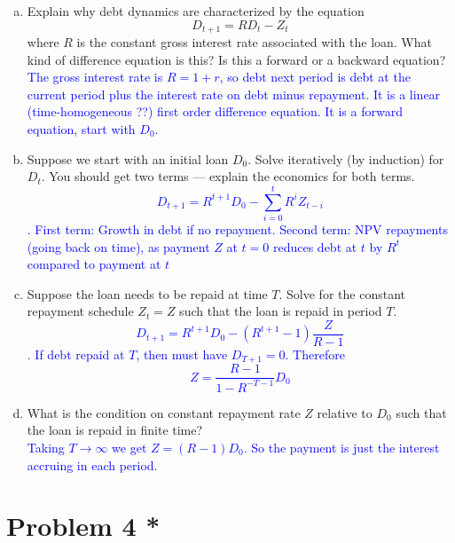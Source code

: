\documentclass[11pt]{extarticle}
\theoremstyle{plain}
\theoremstyle{definition}
\begin{document}
\begin{enumerate}[(a)]
\item Explain why debt dynamics are characterized by the equation
\begin{equation*}
	D_{t+1} = RD_t - Z_t
\end{equation*}
where $R$ is the constant gross interest rate associated with the loan. What kind of difference equation is this? Is this a forward or a backward equation? \\
\textcolor{blue}{The gross interest rate is $R=1+r$, so debt next period is debt at the current period plus the interest rate on debt minus repayment. It is a linear (time-homogeneous ??) first order difference equation. It is a forward equation, start with $D_0$.}

\item Suppose we start with an initial loan $D_0$. Solve iteratively (by induction) for $D_t$. You should get two terms --- explain the economics for both terms.\\
\textcolor{blue}{$$D_{t+1}=R^{t+1} D_0-\sum_{i=0}^t R^i Z_{t-i}$$. First term: Growth in debt if no repayment. Second term: NPV repayments (going back on time), as payment $Z$ at $t=0$ reduces debt at $t$ by $R^t$ compared to payment at $t$ }

\item Suppose the loan needs to be repaid at time $T$. Solve for the constant repayment schedule $Z_t = Z$ such that the loan is repaid in period $T$.\\
\textcolor{blue}{$$D_{t+1}=R^{t+1} D_0-\left(R^{t+1}-1\right) \frac{Z}{R-1}$$. If debt repaid at $T$, then must have $D_{T+1}=0$. Therefore $$Z=\frac{R-1}{1-R^{-T-1}}D_0$$}
\item What is the condition on constant repayment rate $Z$ relative to $D_0$ such that the loan is repaid in finite time? \\
\textcolor{blue}{Taking $T\rightarrow \infty$ we get $Z=(R-1)D_0$. So the payment is just the interest accruing in each period.}
\end{enumerate}



\vspace{10mm}
\section*{Problem 4 *}
\end{document}
